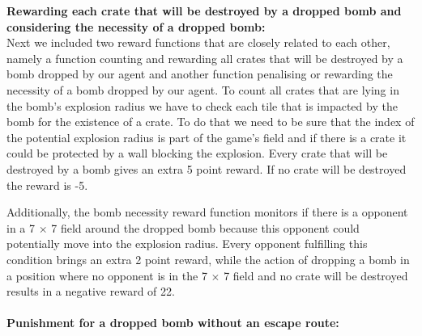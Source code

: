 \noindent \textbf{Rewarding each crate that will be destroyed by a dropped bomb and considering the necessity of a dropped bomb:} \\

\noindent Next we included two reward functions that are closely related to each other, namely a function counting and rewarding all crates that will be destroyed by a bomb dropped by our agent and another function penalising or rewarding the necessity of a bomb dropped by our agent. To count all crates that are lying in the bomb's explosion radius we have to check each tile that is impacted by the bomb for the existence of a crate. To do that we need to be sure that the index of the potential explosion radius is part of the game's field and if there is a crate it could be protected by a wall blocking the explosion. Every crate that will be destroyed by a bomb gives an extra 5 point reward. If no crate will be destroyed the reward is -5. 

Additionally, the bomb necessity reward function monitors if there is a opponent in a 7 $\times$ 7 field around the dropped bomb because this opponent could potentially move into the explosion radius. Every opponent fulfilling this condition brings an extra 2 point reward, while the action of dropping a bomb in a position where no opponent is in the 7 $\times$ 7 field and no crate will be destroyed results in a negative reward of 22.
\\ \\
\textbf{Punishment for a dropped bomb without an escape route:} \\

